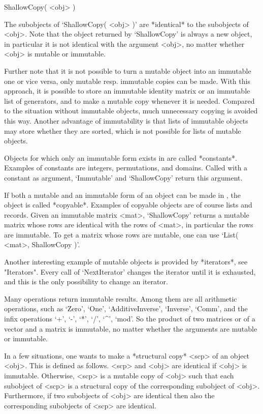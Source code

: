 \>ShallowCopy( <obj> )

The subobjects of `ShallowCopy( <obj> )' are *identical* to the
subobjects of <obj>.
Note that the object returned by `ShallowCopy' is always a new object,
in particular it is not identical with the argument <obj>,
no matter whether <obj> is mutable or immutable.

Further note that it is not possible to turn a mutable object into an
immutable one or vice versa,
only mutable resp. immutable copies can be made.
With this approach,
it is possible to store an immutable identity matrix
or an immutable list of generators,
and to make a mutable copy whenever it is needed.
Compared to the situation without immutable objects,
much unnecessary copying is avoided this way.
Another advantage of immutability is
that lists of immutable objects may store whether they are sorted,
which is not possible for lists of mutable objects.

Objects for which only an immutable form exists in {\GAP}
are called *constants*.
Examples of constants are integers, permutations, and domains.
Called with a constant as argument,
`Immutable' and `ShallowCopy' return this argument.

If both a mutable and an immutable form of an object can be made in
{\GAP}, the object is called *copyable*.
Examples of copyable objects are of course lists and records.
Given an immutable matrix <mat>,
`ShallowCopy' returns a mutable matrix whose rows are identical with the
rows of <mat>,
in particular the rows are immutable.
To get a matrix whose rows are mutable,
one can use `List( <mat>, ShallowCopy )'.

Another interesting example of mutable objects is provided by
*iterators*, see "Iterators".
Every call of `NextIterator' changes the iterator until it is exhausted,
and this is the only possibility to change an iterator.

Many operations return immutable results.
Among them are all arithmetic operations,
such as `Zero', `One', `AdditiveInverse', `Inverse', `Comm',
and the infix operations `+', `-', `*', `/', `^', `mod'.
So the product of two matrices or of a vector and a matrix is immutable,
no matter whether the arguments are mutable or immutable.

In a few situations,
one wants to make a *structural copy* <scp> of an object <obj>.
This is defined as follows.
<scp> and <obj> are identical if <obj> is immutable.
Otherwise, <scp> is a mutable copy of <obj> such that
each subobject of <scp> is a structural copy of the corresponding
subobject of <obj>.
Furthermore, if two subobjects of <obj> are identical then
also the corresponding subobjects of <scp> are identical. 

